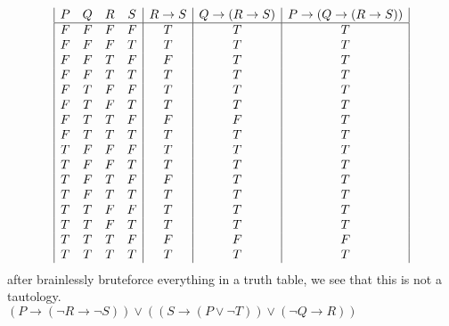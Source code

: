 \documentclass[a4paper,12pt]{article}
\begin{document}
\begin{displaymath}
\begin {array} {|c c c c|c|c|c|c|c}
P & Q & R & S & 
R \rightarrow S &
Q \rightarrow(R \rightarrow S) &
P \rightarrow (Q \rightarrow(R \rightarrow S))\\
\hline

F & F & F & F & T & T & T\\
F & F & F & T & T & T & T\\
F & F & T & F & F & T & T\\
F & F & T & T & T & T & T\\
F & T & F & F & T & T & T\\
F & T & F & T & T & T & T\\
F & T & T & F & F & F & T\\
F & T & T & T & T & T & T\\
T & F & F & F & T & T & T\\
T & F & F & T & T & T & T\\
T & F & T & F & F & T & T\\
T & F & T & T & T & T & T\\
T & T & F & F & T & T & T\\
T & T & F & T & T & T & T\\
T & T & T & F & F & F & F\\
T & T & T & T & T & T & T\\

\end{array}
\end{displaymath}
after brainlessly bruteforce everything in a truth table, we see that this is not a tautology.\\

$(P \rightarrow (\lnot R \rightarrow \lnot S)) \vee ((S \rightarrow (P \vee \lnot T)) \vee (\lnot Q \rightarrow R))$\\
\end{document}
